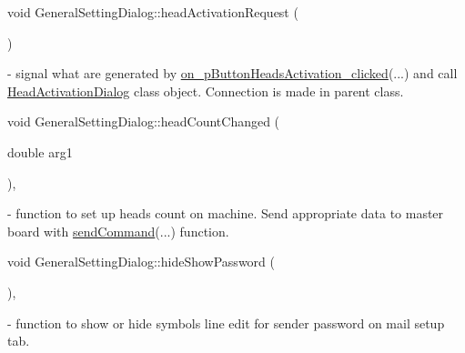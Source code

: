 \mbox{\label{classGeneralSettingDialog_a386763acc4545a1c03542ef71601c23c}} 
{\footnotesize\ttfamily void General\+Setting\+Dialog\+::\texorpdfstring{head\+Activation\+Request}{headActivationRequest} (\begin{DoxyParamCaption}{ }\end{DoxyParamCaption}){\ttfamily [signal]}} - signal what are generated by \hyperlink{classGeneralSettingDialog_a8b72a332c8c98096b1f15cf1fd6b01be}{on\+\_\+p\+Button\+Heads\+Activation\+\_\+clicked}(...) and call \hyperlink{classHeadActivationDialog}{Head\+Activation\+Dialog} class object. Connection is made in parent class.

\mbox{\label{classGeneralSettingDialog_ab986e75742799d02b8268d9743a422d6}} 
{\footnotesize\ttfamily void General\+Setting\+Dialog\+::\texorpdfstring{head\+Count\+Changed}{headCountChanged} (\begin{DoxyParamCaption}\item[{double}]{arg1 }\end{DoxyParamCaption}){\ttfamily [private]}, {\ttfamily [slot]}} - function to set up heads count on machine. Send appropriate data to master board with \hyperlink{classGeneralSettingDialog_aa381596bc44cfcaeb85a8d906b877b86}{send\+Command}(...) function.

\mbox{\label{classGeneralSettingDialog_a15e7d8a20dbb83ea3ee46dd57446ec36}} 
{\footnotesize\ttfamily void General\+Setting\+Dialog\+::\texorpdfstring{hide\+Show\+Password}{hideShowPassword} (\begin{DoxyParamCaption}{ }\end{DoxyParamCaption}){\ttfamily [private]}, {\ttfamily [slot]}} - function to show or hide symbols line edit for sender password on mail setup tab.

